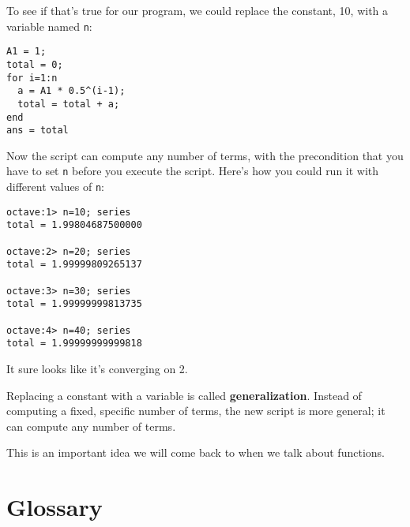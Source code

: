 To see if that's true for our program, we could replace the
constant, 10, with a variable named {\tt n}:

\begin{verbatim}
A1 = 1;
total = 0;
for i=1:n
  a = A1 * 0.5^(i-1);
  total = total + a;
end
ans = total
\end{verbatim}

Now the script can compute any number of terms, with the
precondition that you have to set {\tt n} before you execute
the script. Here's how you could run it with different values
of {\tt n}:

\begin{verbatim}
octave:1> n=10; series
total = 1.99804687500000

octave:2> n=20; series
total = 1.99999809265137

octave:3> n=30; series
total = 1.99999999813735

octave:4> n=40; series
total = 1.99999999999818
\end{verbatim}

It sure looks like it's converging on 2.

Replacing a constant with a variable is called {\bf generalization}.
Instead of computing a fixed, specific number of terms, the new script
is more general; it can compute any number of terms.

This is an important idea we will come back to when we
talk about functions.


\section{Glossary}

